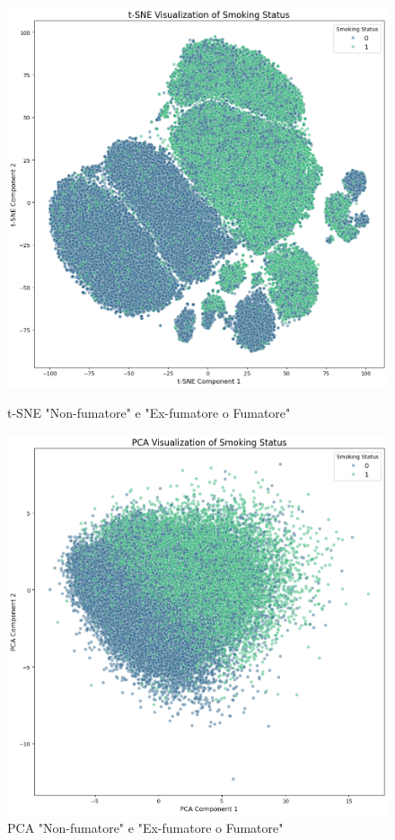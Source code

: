 \begin{figure}[h]
    \centering
    \begin{minipage}{0.45\textwidth}
        \centering
        \includegraphics[width=\textwidth]{screen_results/tSNE_smoking_non_smoking.png}
        \caption{t-SNE "Non-fumatore" e "Ex-fumatore o Fumatore"}
    \end{minipage}
    \hfill
    \begin{minipage}{0.45\textwidth}
        \centering
        \includegraphics[width=\textwidth]{screen_results/pca_smoking_non_smoking.png}
        \caption{PCA "Non-fumatore" e "Ex-fumatore o Fumatore"}
    \end{minipage}
\end{figure}

